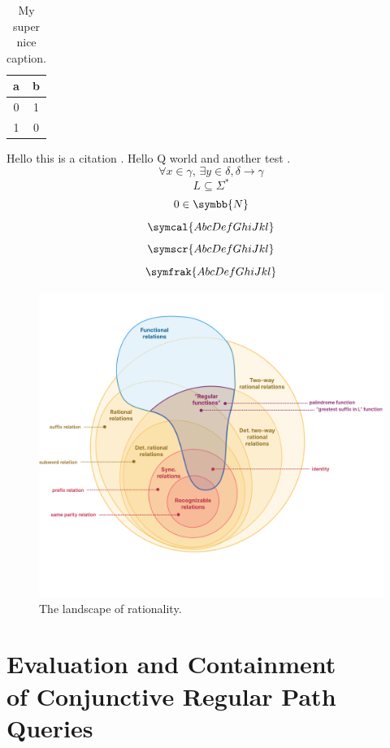 \documentclass[a4paper,sfsidenotes,twoside,justified,nobib]{tufte-book-custom}
\begin{document}

\begin{table}
	\centering
	\begin{tabular}{cc}
		\toprule
		a & b \\ \midrule
		0 & 1 \\
		1 & 0 \\ \bottomrule
	\end{tabular}
	\caption{My super nice caption.}
\end{table}

\citereset
Hello this is a citation \cite{Bringhurst2005}.
Hello Q world and another test \cite{Bringhurst2005}.
\[\forall x \in \gamma,\, \exists y\in \delta, \delta \to \gamma\]
\[L \subseteq \Sigma^*\]
\[0 \in \symbb{N}\]
\[\symcal{AbcDefGhiJkl}\]
\[\symscr{AbcDefGhiJkl}\]
\[\symfrak{AbcDefGhiJkl}\]

\lipsum[1-2]

\begin{figure}[htb]
	\centering
	\includegraphics[width=\linewidth]{fig/landscape.png}
	\caption{The landscape of rationality.}
\end{figure}

\lipsum[3-10]

\chapter[Evaluation and Containment of Conjunctive Regular Path Queries]{Evaluation and Containment\\ of Conjunctive Regular Path Queries}
\end{document}
